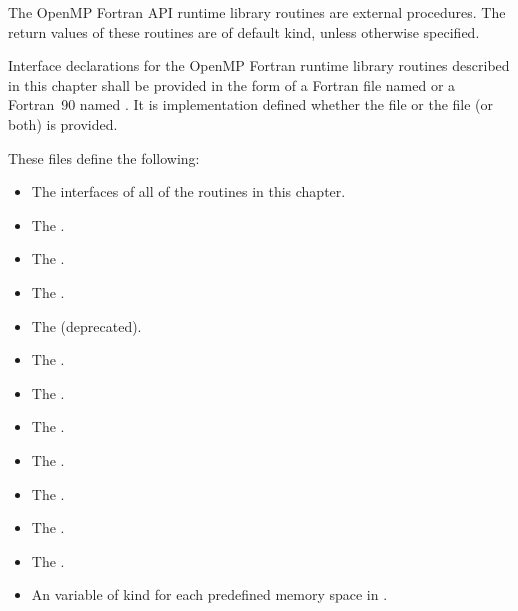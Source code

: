 \begin{fortranspecific}
The OpenMP Fortran API runtime library routines are external procedures. The return
values of these routines are of default kind, unless otherwise specified.

Interface declarations for the OpenMP Fortran runtime library routines described in this
chapter shall be provided in the form of a Fortran  file named  or
a Fortran~90  named . It is implementation defined whether the
 file or the  file (or both) is provided.

These files define the following:

\begin{itemize}
\item The interfaces of all of the routines in this chapter.

\item The   .

\item The   .

\item The   .

\item The    (deprecated).

\item The   .

\item The   .

\item The   .

\item The   .

\item The   .

\item The   .

\item The   .

\item An   variable of kind  for each predefined memory space in .


\end{itemize}
\end{fortranspecific}

